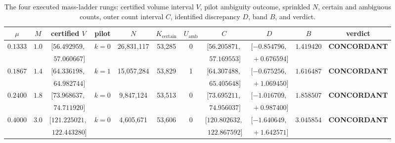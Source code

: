 \begin{table}[t]
\caption{The four executed mass-ladder rungs: certified volume interval
$V$, pilot ambiguity outcome, sprinkled $N$, certain and ambiguous counts,
outer count interval $C$, identified discrepancy $D$, band $B$, and
verdict.}
\label{tab:count}
\centering
\scriptsize
\setlength{\tabcolsep}{2.5pt}
\begin{tabular}{@{}ccccccccccc@{}}
\toprule
$\mu$ & $M$ & certified $V$ & pilot & $N$ & $K_{\mathrm{certain}}$ & $U_{\mathrm{amb}}$ & $C$ & $D$ & $B$ & verdict \\
\midrule
$0.1333$ & $1.0$ & $[56.492959,$ & $k=0$ & 26,831,117 & 53,285 & 0 & $[56.205871,$ & $[-0.854796,$ & $1.419420$ & \textbf{CONCORDANT} \\
 & & $\phantom{[}57.060667]$ & & & & & $\phantom{[}57.169553]$ & $\phantom{[}{+}0.676594]$ & & \\
\addlinespace
$0.1867$ & $1.4$ & $[64.336198,$ & $k=1$ & 15,057,284 & 53,829 & 1 & $[64.307488,$ & $[-0.675256,$ & $1.616487$ & \textbf{CONCORDANT} \\
 & & $\phantom{[}64.982744]$ & & & & & $\phantom{[}65.405648]$ & $\phantom{[}{+}1.069450]$ & & \\
\addlinespace
$0.2400$ & $1.8$ & $[73.968637,$ & $k=0$ & 9,847,124 & 53,513 & 0 & $[73.695211,$ & $[-1.016709,$ & $1.858507$ & \textbf{CONCORDANT} \\
 & & $\phantom{[}74.711920]$ & & & & & $\phantom{[}74.956037]$ & $\phantom{[}{+}0.987400]$ & & \\
\addlinespace
$0.4000$ & $3.0$ & $[121.225021,$ & $k=0$ & 4,605,671 & 53,606 & 0 & $[120.802632,$ & $[-1.640649,$ & $3.045854$ & \textbf{CONCORDANT} \\
 & & $\phantom{[}122.443280]$ & & & & & $\phantom{[}122.867592]$ & $\phantom{[}{+}1.642571]$ & & \\
\bottomrule
\end{tabular}
\end{table}

